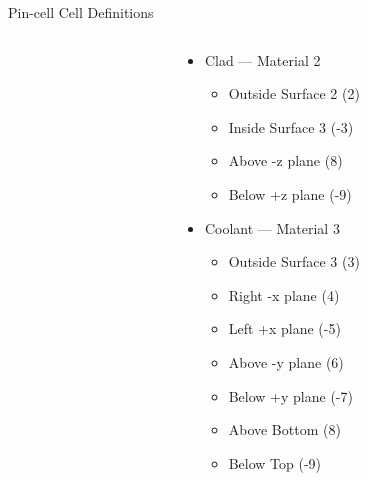 \documentclass[serif]{beamer}
\begin{document}
\begin{frame}[fragile]{Pin-cell Cell Definitions}
\begin{columns}
\begin{column}{0.4\linewidth}
    \end{column}
    \begin{column}{0.4\linewidth}\footnotesize
      \begin{itemize}
        \item<1-> {\color{yellow!80!black} Clad} --- Material 2
        \begin{itemize}\scriptsize
           \item<1-> Outside Surface 2 (2)
           \item<1-> Inside Surface 3 (-3) 
           \item<1-> Above -z plane (8)
           \item<1-> Below +z plane (-9)
        \end{itemize}\vfill
        \item<1-> {\color{blue} Coolant} --- Material 3
        \begin{itemize}\scriptsize
           \item<1-> Outside Surface 3 (3)
           \item<1-> Right -x plane (4)
           \item<1-> Left +x plane (-5)
           \item<1-> Above -y plane (6)
           \item<1-> Below +y plane (-7)
           \item<1-> Above Bottom (8)
           \item<1-> Below Top (-9)
        \end{itemize}
      \end{itemize}
    \end{column}
  \end{columns}

\end{frame}

\end{document}
